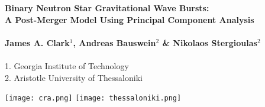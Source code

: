 \documentclass[a0,landscape]{a0poster}
\begin{document}


\begin{minipage}[b]{0.73\linewidth}
\veryHuge \color{NavyBlue} \textbf{Binary Neutron Star Gravitational Wave
Bursts:  \\A Post-Merger Model Using Principal Component Analysis} \color{Black}\\ \\%
\huge \textbf{James A. Clark$^{1}$, Andreas Bauswein$^{2}$ \& Nikolaos Stergioulas$^{2}$}\\ \\%
\large 1. Georgia Institute of Technology\\ %
\large 2. Aristotle University of Thessaloniki\\ %
\end{minipage}
%
\hspace{2.5cm}
%
\begin{minipage}[b]{0.25\linewidth}
    \texttt{[image: cra.png]} \hspace{1cm}
\texttt{[image: thessaloniki.png]} %
~\\~\\~\\~\\~\\~\\
\end{minipage}

\vspace{1cm} %

\end{document}
